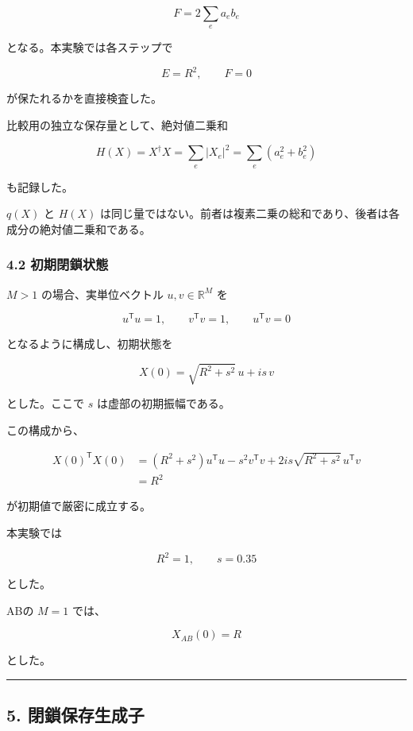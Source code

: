\documentclass[
  10pt,
  a4paper,
]{article}
\begin{document}
\[
F
=
2\sum_e a_e b_e
\]

となる。本実験では各ステップで

\[
E=R^2,
\qquad
F=0
\]

が保たれるかを直接検査した。

比較用の独立な保存量として、絶対値二乗和

\[
H(X)
=
X^\dagger X
=
\sum_e\lvert X_e\rvert^2
=
\sum_e\left(a_e^2+b_e^2\right)
\]

も記録した。

\(q(X)\) と \(H(X)\)
は同じ量ではない。前者は複素二乗の総和であり、後者は各成分の絶対値二乗和である。

\subsubsection{4.2
初期閉鎖状態}\label{ux521dux671fux9589ux9396ux72b6ux614b}

\(M>1\) の場合、実単位ベクトル \(u,v\in\mathbb R^M\) を

\[
u^{\mathsf T}u=1,
\qquad
v^{\mathsf T}v=1,
\qquad
u^{\mathsf T}v=0
\]

となるように構成し、初期状態を

\[
X(0)
=
\sqrt{R^2+s^2}\,u
+
i s\,v
\]

とした。ここで \(s\) は虚部の初期振幅である。

この構成から、

\[
\begin{aligned}
X(0)^{\mathsf T}X(0)
&=
(R^2+s^2)u^{\mathsf T}u
-s^2v^{\mathsf T}v
+2is\sqrt{R^2+s^2}\,u^{\mathsf T}v\\
&=R^2
\end{aligned}
\]

が初期値で厳密に成立する。

本実験では

\[
R^2=1,
\qquad
s=0.35
\]

とした。

ABの \(M=1\) では、

\[
X_{AB}(0)=R
\]

とした。

\begin{center}\rule{0.5\linewidth}{0.5pt}\end{center}

\subsection{5.
閉鎖保存生成子}\label{ux9589ux9396ux4fddux5b58ux751fux6210ux5b50}
\end{document}
